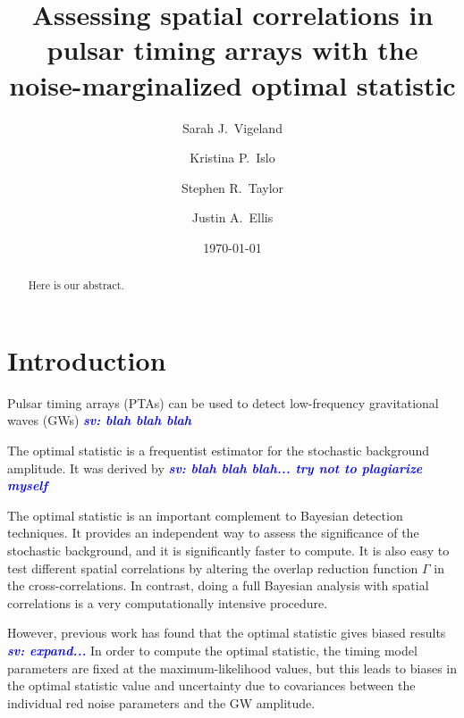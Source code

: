 \documentclass[twocolumn,aps,prd,superscriptaddress]{revtex4-1}
\newcommand{\sv}[1]{\textcolor{blue}{\it{\textbf{sv: #1}}} }
\begin{document}
\title{Assessing spatial correlations in pulsar timing arrays with the noise-marginalized optimal statistic}


\author{Sarah J.\ Vigeland}

\author{Kristina P.\ Islo}

\author{Stephen R.\ Taylor}

\author{Justin A.\ Ellis}

\date{\today}  

\begin{abstract}
Here is our abstract.
\end{abstract}

\maketitle


\section{Introduction}

Pulsar timing arrays (PTAs) can be used to detect low-frequency gravitational waves (GWs) \sv{blah blah blah}

The optimal statistic is a frequentist estimator for the stochastic background amplitude. 
It was derived by \citet{abc+2009} \sv{blah blah blah... try not to plagiarize myself}

The optimal statistic is an important complement to Bayesian detection techniques. 
It provides an independent way to assess the significance of the stochastic background, 
and it is significantly faster to compute. It is also easy to test different spatial correlations 
by altering the overlap reduction function $\Gamma$ in the cross-correlations. 
In contrast, doing a full Bayesian analysis with spatial correlations is a very computationally 
intensive procedure.

However, previous work has found that the optimal statistic gives biased results \sv{expand...} 
In order to compute the optimal statistic, the timing model parameters are fixed 
at the maximum-likelihood values, but this leads to biases in the 
optimal statistic value and uncertainty due to covariances between the 
individual red noise parameters and the GW amplitude. 
\end{document}
